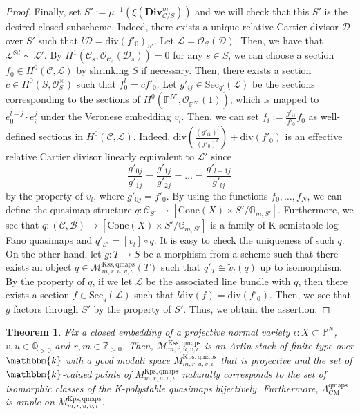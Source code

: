 \documentclass[12pt,twoside]{amsart}
\newtheorem{thm}{Theorem}[section]
\theoremstyle{definition}
\begin{document}
\begin{proof}
Finally, set $S':=\mu^{-1}(\xi(\mathbf{Div}_{\mathcal{C}/S}^m))$ and we will check that this $S'$ is the desired closed subscheme.
Indeed, there exists a unique relative Cartier divisor $\mathscr{D}$ over $S'$ such that $l\mathscr{D}=\mathrm{div}(f'_0)_{S'}$.
Let $\mathscr{L}=\mathcal{O}_{\mathcal{C}}(\mathscr{D})$.
Then, we have that $\mathscr{L}^{\otimes l}\sim\mathscr{L}'$.
By $H^1(\mathcal{C}_s,\mathcal{O}_{\mathcal{C}_s}(\mathscr{D}_s))=0$ for any $s\in S$, we can choose a section $f_0\in H^0(\mathcal{C},\mathscr{L})$ by shrinking $S$ if necessary.
Then, there exists a section $c\in H^0(S,\mathcal{O}_{S}^{\times})$ such that $f_0^l=cf'_0$.
Let $g'_{ij}\in\mathrm{Sec}_{q'}(\mathscr{L})$ be the sections corresponding to the sections of $H^0(\mathbb{P}^{N'},\mathcal{O}_{\mathbb{P}^{N'}}(1))$, which is mapped to $e_0^{l-j}\cdot e^j_{i}$ under the Veronese embedding $v_l$.
Then, we can set $f_i:=\frac{g'_{i1}}{f'_0}f_0$ as well-defined sections in $H^0(\mathcal{C},\mathscr{L})$.
Indeed, $\mathrm{div}\left(\frac{(g'_{i1})^l}{(f'_0)^l}\right)+\mathrm{div}(f'_0)$ is an effective relative Cartier divisor linearly equivalent to $\mathscr{L}'$ since 
\[
\frac{g'_{0j}}{g'_{1j}}=\frac{g'_{1j}}{g'_{2j}}=\ldots=\frac{g'_{l-1j}}{g'_{lj}}
\]
by the property of $v_l$, where $g'_{0j}=f'_0$.
By using the functions $f_0,\ldots, f_{N}$, we can define the quasimap structure $q\colon \mathcal{C}_{S'}\to [\mathrm{Cone}(X)\times S'/\mathbb{G}_{m,S'}]$.
Furthermore, we see that $q\colon (\mathcal{C},\mathcal{B})\to [\mathrm{Cone}(X)\times S'/\mathbb{G}_{m,S'}]$ is a family of K-semistable log Fano quasimaps and $q'_{S'}=[v_l]\circ q$.
It is easy to check the uniqueness of such $q$.
On the other hand, let $g\colon T\to S$ be a morphism from a scheme such that there exists an object $q\in \mathcal{M}^{\mathrm{Kss,qmaps}}_{m,r,u,v,\iota}(T)$ such that $q'_T\cong\tilde{v}_l(q)$ up to isomorphism.
By the property of $q$, if we let $\mathscr{L}$ be the associated line bundle with $q$, then there exists a section $f\in\mathrm{Sec}_q(\mathscr{L})$ such that $l\mathrm{div}(f)=\mathrm{div}(f'_0)$.
Then, we see that $g$ factors through $S'$ by the property of $S'$.
Thus, we obtain the assertion.
\end{proof}

\begin{thm}\label{thm--K-moduli-of-log-Fano-quasimaps}
Fix a closed embedding of a projective normal variety $\iota\colon X\subset \mathbb{P}^N$, $v,u\in\mathbb{Q}_{>0}$ and $r,m\in\mathbb{Z}_{>0}$. 
Then, $\mathcal{M}^{\mathrm{Kss,qmaps}}_{m,r,u,v,\iota}$ is an Artin stack of finite type over $\mathbbm{k}$ with a good moduli space $M^{\mathrm{Kps,qmaps}}_{m,r,u,v,\iota}$ that is projective and the set of $\mathbbm{k}$-valued points of $M^{\mathrm{Kps,qmaps}}_{m,r,u,v,\iota}$ naturally corresponds to the set of isomorphic classes of the K-polystable quasimaps bijectively.  
Furthermore, $\Lambda^{\mathrm{qmaps}}_{\mathrm{CM}}$ is ample on $M^{\mathrm{Kps,qmaps}}_{m,r,u,v,\iota}$.
\end{thm}
\end{document}
